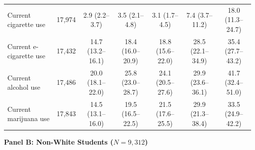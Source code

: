 \documentclass[12pt]{article}
\begin{document}
\begin{landscape}
\begin{table}[p]
\begin{tabular}{l r ccccc}
\quad Current cigarette use & 17,974 & 2.9 (2.2--3.7) & 3.5 (2.1--4.8) & 3.1 (1.7--4.5) & 7.4 (3.7--11.2) & 18.0 (11.3--24.7) \\
\quad Current e-cigarette use & 17,432 & 14.7 (13.2--16.1) & 18.4 (16.0--20.9) & 18.8 (15.6--22.0) & 28.5 (22.1--34.9) & 35.4 (27.7--43.2) \\
\quad Current alcohol use & 17,486 & 20.0 (18.1--22.0) & 25.8 (23.0--28.7) & 24.1 (20.5--27.6) & 29.9 (23.6--36.1) & 41.7 (32.4--51.0) \\
\quad Current marijuana use & 17,843 & 14.5 (13.1--16.0) & 19.5 (16.5--22.5) & 21.5 (17.6--25.5) & 29.9 (21.3--38.4) & 33.5 (24.9--42.2) \\
\bottomrule
\end{tabular}

\vspace{8pt}

\textbf{Panel B: Non-White Students ($N = 9,312$)}
\vspace{2pt}


\end{table}
\end{landscape}
\end{document}
